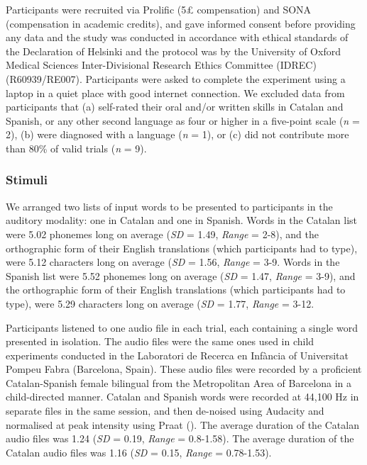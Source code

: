 \documentclass[
]{article}
\begin{document}
Participants were recruited via Prolific (5£ compensation) and SONA
(compensation in academic credits), and gave informed consent before
providing any data and the study was conducted in accordance with
ethical standards of the Declaration of Helsinki and the protocol was by
the University of Oxford Medical Sciences Inter-Divisional Research
Ethics Committee (IDREC) (R60939/RE007). Participants were asked to
complete the experiment using a laptop in a quiet place with good
internet connection. We excluded data from participants that (a)
self-rated their oral and/or written skills in Catalan and Spanish, or
any other second language as four or higher in a five-point scale
(\emph{n} = 2), (b) were diagnosed with a language (\emph{n} = 1), or
(c) did not contribute more than 80\% of valid trials (\emph{n} = 9).

\subsubsection{Stimuli}\label{stimuli}

We arranged two lists of input words to be presented to participants in
the auditory modality: one in Catalan and one in Spanish. Words in the
Catalan list were 5.02 phonemes long on average (\emph{SD} = 1.49,
\emph{Range} = 2-8), and the orthographic form of their English
translations (which participants had to type), were 5.12 characters long
on average (\emph{SD} = 1.56, \emph{Range} = 3-9. Words in the Spanish
list were 5.52 phonemes long on average (\emph{SD} = 1.47, \emph{Range}
= 3-9), and the orthographic form of their English translations (which
participants had to type), were 5.29 characters long on average
(\emph{SD} = 1.77, \emph{Range} = 3-12.

Participants listened to one audio file in each trial, each containing a
single word presented in isolation. The audio files were the same ones
used in child experiments conducted in the Laboratori de Recerca en
Infància of Universitat Pompeu Fabra (Barcelona, Spain). These audio
files were recorded by a proficient Catalan-Spanish female bilingual
from the Metropolitan Area of Barcelona in a child-directed manner.
Catalan and Spanish words were recorded at 44,100 Hz in separate files
in the same session, and then de-noised using Audacity and normalised at
peak intensity using Praat (). The average duration of the Catalan audio files was
1.24 (\emph{SD} = 0.19, \emph{Range} = 0.8-1.58). The average duration
of the Catalan audio files was 1.16 (\emph{SD} = 0.15, \emph{Range} =
0.78-1.53).
\end{document}
